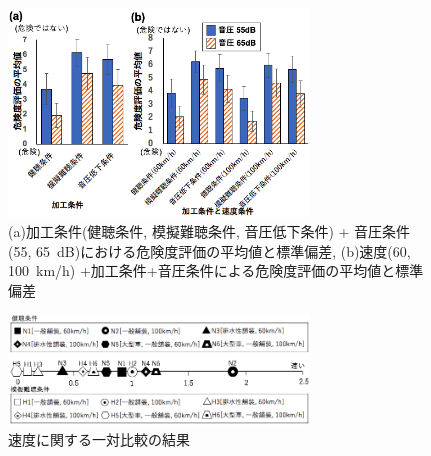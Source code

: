 \documentclass[10pt,twocolumn,uplatex,dvipdfmx]{jsarticle} %
\begin{document}

\begin{figure}[H]
  \begin{center}
      \includegraphics[width=8cm]{image/danger_result.png}
      \caption{(a)加工条件(健聴条件, 模擬難聴条件, 音圧低下条件) + 音圧条件(55, 65~dB)における危険度評価の平均値と標準偏差, (b)速度(60, 100~km/h) +加工条件+音圧条件による危険度評価の平均値と標準偏差}
      \label{fig:danger_result}
  \end{center}
\end{figure}

\vspace{-12truemm}

\begin{figure}[H]
  \begin{center}
      \includegraphics[width=8cm]{image/speed_result.png}
      \caption{速度に関する一対比較の結果}
      \label{fig:speed_result}
  \end{center}
\end{figure}
\end{document}
